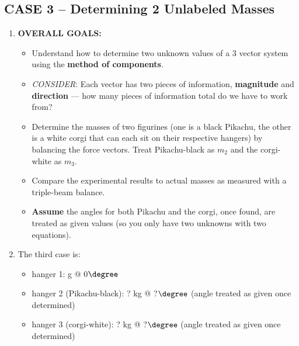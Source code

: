 \subsection{CASE 3 -- Determining 2 Unlabeled Masses}




\begin{enumerate}
\item \textbf{OVERALL GOALS:} 
\begin{itemize}
    \item Understand how to determine two unknown values of a 3 vector system using the \textbf{method of components}. 
    \item \textit{CONSIDER}: Each vector has two pieces of information, \textbf{magnitude} and \textbf{direction} --- how many pieces of information total do we have to work from?
    \item Determine the masses of two figurines (one is a black Pikachu, the other is a white corgi that can each sit on their respective hangers) by balancing the force vectors. Treat Pikachu-black as $m_2$ and the corgi-white as $m_3$.
    \item Compare the experimental results to actual masses as measured with a triple-beam balance.
    \item \textbf{Assume} the angles for both Pikachu and the corgi, once found, are treated as given values (so you only have two unknowns with two equations).
\end{itemize}

\item The third case is:
    \begin{itemize}
        \item hanger 1: \space\space\space\space\space\space\space\space\space\space\space\space\space\space\space\space{} g @ 0$\degree$
        \item hanger 2 (Pikachu-black): ? kg @ ?$\degree$ (angle treated as given once determined)
        \item hanger 3 (corgi-white): \space\space\space? kg @ ?$\degree$ (angle treated as given once determined)
    \end{itemize}


\end{enumerate}

